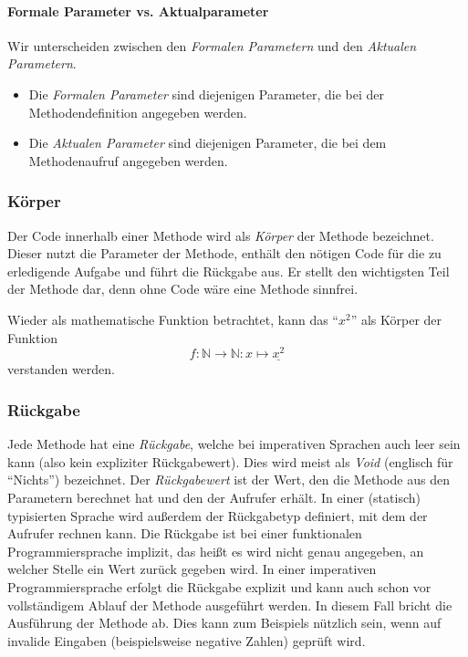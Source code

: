 		\paragraph{Formale Parameter vs. Aktualparameter}
			Wir unterscheiden zwischen den \textit{Formalen Parametern} und den \textit{Aktualen Parametern}.
			
			\begin{itemize}
				\item Die \textit{Formalen Parameter} sind diejenigen Parameter, die bei der Methodendefinition angegeben werden.
				\item Die \textit{Aktualen Parameter} sind diejenigen Parameter, die bei dem Methodenaufruf angegeben werden.
			\end{itemize}
	
	\subsubsection{Körper} \functionalMark \imperativeMark \oopMark
		Der Code innerhalb einer Methode wird als \textit{Körper} der Methode bezeichnet. Dieser nutzt die Parameter der Methode, enthält den nötigen Code für die zu erledigende Aufgabe und führt die Rückgabe aus. Er stellt den wichtigsten Teil der Methode dar, denn ohne Code wäre eine Methode sinnfrei.
		
		Wieder als mathematische Funktion betrachtet, kann das \enquote{\( x ^ 2 \)} als Körper der Funktion \[ f : \mathbb{N} \rightarrow \mathbb{N} : x \mapsto \underline{x ^ 2} \] verstanden werden.
	
	\subsubsection{Rückgabe} \functionalMark \imperativeMark \oopMark
		Jede Methode hat eine \textit{Rückgabe}, welche bei imperativen Sprachen auch leer sein kann (also kein expliziter Rückgabewert). Dies wird meist als \textit{Void} (englisch für \enquote{Nichts}) bezeichnet. Der \textit{Rückgabewert} ist der Wert, den die Methode aus den Parametern berechnet hat und den der Aufrufer erhält. In einer (statisch) typisierten Sprache wird außerdem der Rückgabetyp definiert, mit dem der Aufrufer rechnen kann. Die Rückgabe ist bei einer funktionalen Programmiersprache implizit, das heißt es wird nicht genau angegeben, an welcher Stelle ein Wert zurück gegeben wird. In einer imperativen Programmiersprache erfolgt die Rückgabe explizit und kann auch schon vor vollständigem Ablauf der Methode ausgeführt werden. In diesem Fall bricht die Ausführung der Methode ab. Dies kann zum Beispiels nützlich sein, wenn auf invalide Eingaben (beispielsweise negative Zahlen) geprüft wird.
		
